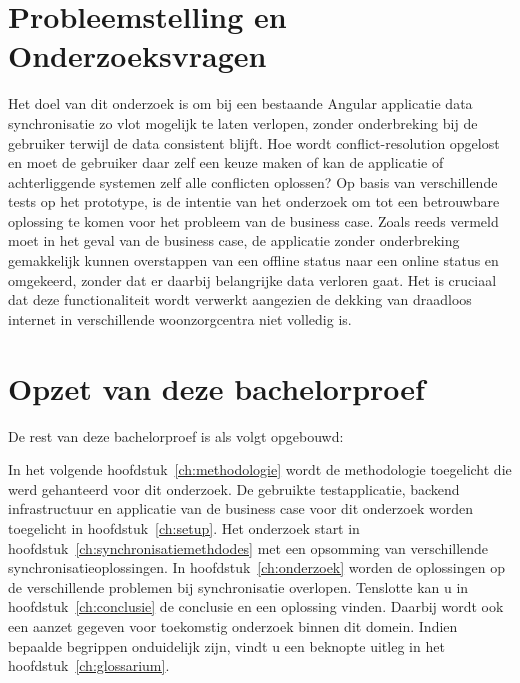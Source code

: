 \section{Probleemstelling en Onderzoeksvragen}
\label{sec:onderzoeksvragen}
Het doel van dit onderzoek is om bij een bestaande Angular applicatie data synchronisatie zo vlot mogelijk te laten verlopen, zonder onderbreking bij de gebruiker terwijl de data consistent blijft. Hoe wordt conflict-resolution opgelost en moet de gebruiker daar zelf een keuze maken of kan de applicatie of achterliggende systemen zelf alle conflicten oplossen? Op basis van verschillende tests op het prototype, is de intentie van het onderzoek om tot een betrouwbare oplossing te komen voor het probleem van de business case. Zoals reeds vermeld moet in het geval van de business case, de applicatie zonder onderbreking gemakkelijk kunnen overstappen van een offline status naar een online status en omgekeerd, zonder dat er daarbij belangrijke data verloren gaat. Het is cruciaal dat deze functionaliteit wordt verwerkt aangezien de dekking van draadloos internet in verschillende woonzorgcentra niet volledig is.

\section{Opzet van deze bachelorproef}
\label{sec:opzet-bachelorproef}


De rest van deze bachelorproef is als volgt opgebouwd:

In het volgende hoofdstuk~\ref{ch:methodologie} wordt de methodologie toegelicht die werd gehanteerd voor dit onderzoek. De gebruikte testapplicatie, backend infrastructuur  en applicatie van de business case voor dit onderzoek worden toegelicht in hoofdstuk~\ref{ch:setup}. Het onderzoek start in hoofdstuk~\ref{ch:synchronisatiemethdodes} met een opsomming van verschillende synchronisatieoplossingen. In hoofdstuk~\ref{ch:onderzoek} worden de oplossingen op de verschillende problemen bij synchronisatie overlopen. Tenslotte kan u in hoofdstuk~\ref{ch:conclusie} de conclusie en een oplossing vinden. Daarbij wordt ook een aanzet gegeven voor toekomstig onderzoek binnen dit domein.
Indien bepaalde begrippen onduidelijk zijn, vindt u een beknopte uitleg in het hoofdstuk~\ref{ch:glossarium}.


